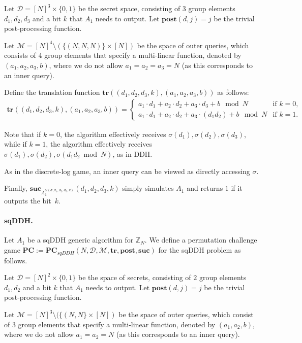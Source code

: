 \documentclass[11pt]{article}
\newcommand{\SECS}{{\mathcal{D}}}
\newcommand{\SUC}{\boldsymbol{suc}}
\newcommand{\TR}{\boldsymbol{tr}}
\newcommand{\POST}{\boldsymbol{post}}
\newcommand{\PC}{\boldsymbol{PC}}
\begin{document}
Let $\SECS = [N]^3 \times \{0,1\}$ be the secret space, consisting of $3$ group elements $d_1,d_2,d_3$ and a bit $k$ that $A_1$ needs to output.
Let $\POST(d,j) = j$ be the trivial post-processing function.

Let $\mathcal{M} = [N]^4 \setminus (\{(N,N,N)\} \times [N])$ be the space of outer queries, which consists of $4$ group elements that specify a multi-linear function, denoted by $(a_1,a_2,a_3,b)$,
where we do not allow $a_1 = a_2 = a_3 = N$ (as this corresponds to an inner query). 

Define the translation function
$\TR((d_1,d_2,d_3,k),(a_1,a_2,a_3,b))$ as  
follows:
\begin{align*}
\TR((d_1,d_2,d_3,k),(a_1,a_2,a_3,b) ) =
\begin{cases}
a_1 \cdot d_{1} + a_2 \cdot d_{2} + a_3 \cdot d_{3} + b \mod N & \text{if } k=0, \\
a_1 \cdot d_{1} + a_2 \cdot d_{2} + a_3 \cdot (d_{1} d_{2}) + b \mod N & \text{if } k = 1.
\end{cases}
\end{align*}

Note that if   
$k = 0$, the algorithm effectively receives $\sigma(d_1),\sigma(d_2),\sigma(d_3)$, while if
$k = 1$, the algorithm effectively receives $\sigma(d_1),\sigma(d_2),\sigma(d_1 d_2 \bmod N)$, as in DDH.

As in the discrete-log game, an inner query can be viewed as directly accessing $\sigma$.

Finally, 
$\SUC_{A_1^{\mathcal{O}(\sigma,d_1,d_2,d_3,k)}}(d_1,d_2,d_3,k)$
simply simulates $A_1$ and returns $1$ if it outputs the bit~$k$.



\paragraph{sqDDH.} 
Let $A_1$ be a sqDDH generic algorithm for $\mathbb{Z}_N$.
We define a permutation challenge game
$\PC := \PC_{sqDDH}(N,\SECS,\mathcal{M},\TR,\POST,\SUC)$ for the sqDDH problem as follows.

Let $\SECS = [N]^2 \times \{0,1\}$ be the space of secrets, consisting of $2$ group elements $d_1,d_2$ and a bit $k$ that $A_1$ needs to output.
Let $\POST(d,j) = j$ be the trivial post-processing function.
 
Let $\mathcal{M} = [N]^3 \setminus (\{(N,N\} \times [N])$ be the space of outer queries, which consist of $3$ group elements that specify a multi-linear function, denoted by $(a_1,a_2,b)$,
where we do not allow $a_1 = a_2 = N$ (as this corresponds to an inner query). 
\end{document}

